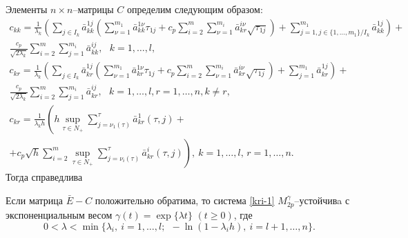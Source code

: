 Элементы $n\times n$--матрицы $C$ определим следующим образом:
$$
\begin{array}{crl}
c_{kk}  = \frac{1}{\lambda _k }\left(\sum \limits_{j \in I_k}\bar
a^{1j}_{kk}\left(\sum \limits_{\nu=1}^{m_1}\bar a^{1\nu}_{kk}\tau
_{1j}  + c_p\sum \limits_{i=2}^m \sum \limits_{\nu=1}^{m_i}\bar
a^{i\nu}_{kr}\sqrt{\tau _{1j}}\right) + \sum \limits_{j=1, j \in
\{1,\dots,m_1\}/ I_k}^{m_1} \bar a^{1j}_{kk}\right)+ \\
\frac{c_p}{\sqrt{2\lambda_k }}\sum
\limits_{i=2}^m \sum \limits_{j=1}^{m_i}\bar a^{ij}_{kk}, \ \ \ k = 1,\dots,l,\\
c_{kr} = \frac{1}{\lambda _k }\left(\sum \limits_{j \in I_k}\bar
a^{1j}_{kr}\left(\sum \limits_{\nu=1}^{m_1}\bar a^{1\nu}_{kr} \tau
_{1j} +  c_p\sum \limits_{i=2}^m \sum \limits_{\nu=1}^{m_i}\bar
a^{i\nu}_{kr}\sqrt{\tau _{1j}}\right) + \sum \limits_{j=1}^{m_1}
\bar a^{1j}_{kr}\right)+ \\
\frac{c_p}{\sqrt{2\lambda_k }}\sum \limits_{i=2}^m \sum
\limits_{j=1}^{m_i}\bar a^{ij}_{kr}, \ \ \ k =
1,\dots,l,r = 1, \dots, n, k \neq r,\\
 c_{kr} = \frac{1}{\lambda_kh}
\left(h\mathrel {\mathop {\sup} \limits _{\tau \in N_+}}\sum \limits
_{j=\nu _1 (\tau)}^{\tau}\bar a^{1}_{kr}(\tau,j) +
\right. \\ \left. +
c_p\sqrt{h}\sum
\limits _{i=2}^{m}\mathrel {\mathop {\sup} \limits _{\tau \in
N_+}}\sum \limits _{j=\nu _i (\tau)}^{\tau}\bar
a^{i}_{kr}(\tau,j)\right), \ k = 1,\dots,l,\, r  = 1,\dots,n.
\end{array}
$$
Тогда справедлива

\begin{theorem}\label{kri-th5}
Если матрица $\bar E - C$ положительно
обратима, то система \eqref{kri-1} $M_{2p}^\gamma $--устой\-чи\-вa с
экспоненциальным весом $\gamma (t) = \exp \{\lambda t\} \,\, (t \geq
0)$, где \begin{equation}\label{kri-9}0<\lambda < \min \{\lambda _i, \ i = 1, \dots,l; \ \ -\ln
(1-\lambda _ih), \ i = l+1, \dots, n \}.
\end{equation}
\end{theorem}

